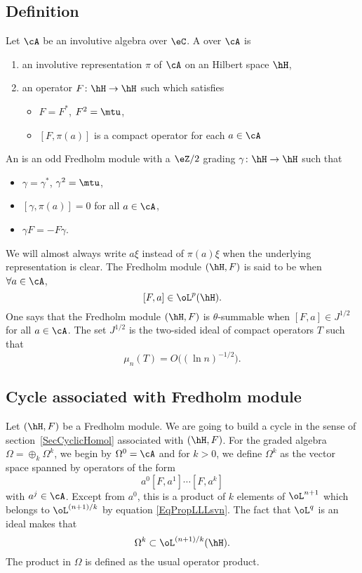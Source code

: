 \subsection{Definition}

Let $\cA$ be an involutive algebra over $\eC$. A  over $\cA$ is
 \begin{enumerate}
\item an involutive representation $\pi$ of $\cA$ on an Hilbert space $\hH$,
\item an operator $F\colon \hH\to \hH$ such which satisfies
\begin{itemize}
\item $F=F^*$, $F^2=\mtu$,
\item $[F,\pi(a)]$ is a compact operator for each $a\in\cA$
\end{itemize}

\end{enumerate}

An  is an odd Fredholm module with a $\eZ/2$ grading $\gamma\colon \hH\to \hH$ such that
\begin{itemize}
\item $\gamma=\gamma^*$, $\gamma^2=\mtu$,
\item $[\gamma,\pi(a)]=0$ for all $a\in\cA$,
\item $\gamma F=-F\gamma$.
\end{itemize}
We will almost always write $a\xi$ instead of $\pi(a)\xi$ when the underlying representation is clear. The Fredholm module $(\hH,F)$ is said to be  when $\forall a\in\cA$,
\[
  [F,a]\in\oL^p(\hH).
\]
One says that the Fredholm module $(\hH,F)$ is $\theta$-summable when $[F,a]\in J^{1/2}$ for all $a\in\cA$. The set $J^{1/2}$ is the two-sided ideal of compact operators $T$ such that
\[
  \mu_n(T)=O\big( (\ln n)^{-1/2} \big).
\]

\subsection{Cycle associated with Fredholm module}

Let $(\hH,F)$ be a Fredholm module. We are going to build a cycle in the sense of section~\ref{SecCyclicHomol} associated with $(\hH,F)$. For the graded algebra $\Omega=\oplus_k\Omega^k$, we begin by $\Omega^0=\cA$ and for $k>0$, we define $\Omega^k$ as the vector space spanned by operators of the form
\[
  a^0[F,a^1]\cdots[F,a^k]
\]
with $a^{j}\in\cA$. Except from $a^0$, this is a product of $k$ elements of $\oL^{n+1}$ which belongs to $\oL^{(n+1)/k}$ by equation \eqref{EqPropLLLsvn}. The fact that $\oL^q$ is an ideal makes that
\[
  \Omega^k\subset\oL^{(n+1)/k}(\hH).
\]
The product in $\Omega$ is defined as the usual operator product.

